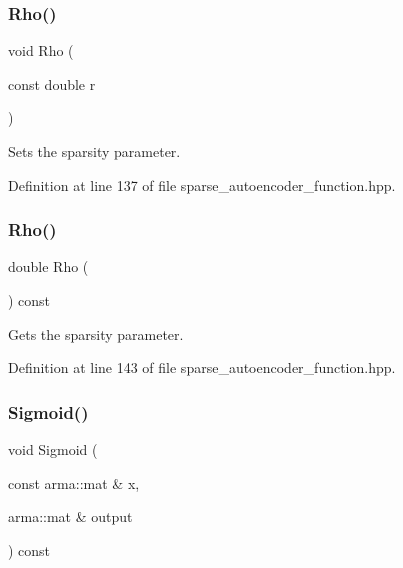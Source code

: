 \subsubsection{Rho()\hspace{0.1cm}{\footnotesize\ttfamily [1/2]}}
{\footnotesize\ttfamily void Rho (\begin{DoxyParamCaption}\item[{const double}]{r }\end{DoxyParamCaption})\hspace{0.3cm}{\ttfamily [inline]}}



Sets the sparsity parameter. 



Definition at line 137 of file sparse\+\_\+autoencoder\+\_\+function.\+hpp.

\mbox{\label{classmlpack_1_1nn_1_1SparseAutoencoderFunction_a309719b378c0bb1962982a8162e58e84}} 
\subsubsection{Rho()\hspace{0.1cm}{\footnotesize\ttfamily [2/2]}}
{\footnotesize\ttfamily double Rho (\begin{DoxyParamCaption}{ }\end{DoxyParamCaption}) const\hspace{0.3cm}{\ttfamily [inline]}}



Gets the sparsity parameter. 



Definition at line 143 of file sparse\+\_\+autoencoder\+\_\+function.\+hpp.

\mbox{\label{classmlpack_1_1nn_1_1SparseAutoencoderFunction_a78a48b3c359a36dbc1d6936d7c8ba276}} 
\subsubsection{Sigmoid()}
{\footnotesize\ttfamily void Sigmoid (\begin{DoxyParamCaption}\item[{const arma\+::mat \&}]{x,  }\item[{arma\+::mat \&}]{output }\end{DoxyParamCaption}) const\hspace{0.3cm}{\ttfamily [inline]}}



